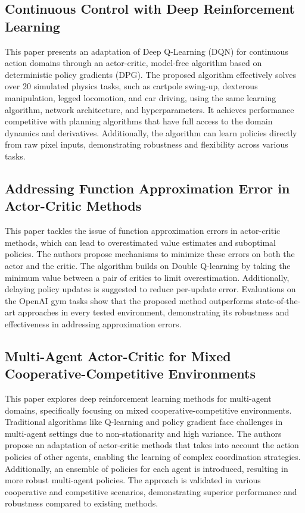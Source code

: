 \documentclass[journal]{IEEEtran}
\begin{document}
\subsection{Continuous Control with Deep Reinforcement Learning}
This paper presents an adaptation of Deep Q-Learning (DQN) for continuous action domains through an actor-critic, model-free algorithm based on deterministic policy gradients (DPG). The proposed algorithm effectively solves over 20 simulated physics tasks, such as cartpole swing-up, dexterous manipulation, legged locomotion, and car driving, using the same learning algorithm, network architecture, and hyperparameters. It achieves performance competitive with planning algorithms that have full access to the domain dynamics and derivatives. Additionally, the algorithm can learn policies directly from raw pixel inputs, demonstrating robustness and flexibility across various tasks.
\cite{lillicrap2019}

\subsection{Addressing Function Approximation Error in Actor-Critic Methods}
This paper tackles the issue of function approximation errors in actor-critic methods, which can lead to overestimated value estimates and suboptimal policies. The authors propose mechanisms to minimize these errors on both the actor and the critic. The algorithm builds on Double Q-learning by taking the minimum value between a pair of critics to limit overestimation. Additionally, delaying policy updates is suggested to reduce per-update error. Evaluations on the OpenAI gym tasks show that the proposed method outperforms state-of-the-art approaches in every tested environment, demonstrating its robustness and effectiveness in addressing approximation errors.
\cite{fujimoto2018}

\subsection{Multi-Agent Actor-Critic for Mixed Cooperative-Competitive Environments}
This paper explores deep reinforcement learning methods for multi-agent domains, specifically focusing on mixed cooperative-competitive environments. Traditional algorithms like Q-learning and policy gradient face challenges in multi-agent settings due to non-stationarity and high variance. The authors propose an adaptation of actor-critic methods that takes into account the action policies of other agents, enabling the learning of complex coordination strategies. Additionally, an ensemble of policies for each agent is introduced, resulting in more robust multi-agent policies. The approach is validated in various cooperative and competitive scenarios, demonstrating superior performance and robustness compared to existing methods.
\cite{lowe2020}
\end{document}
